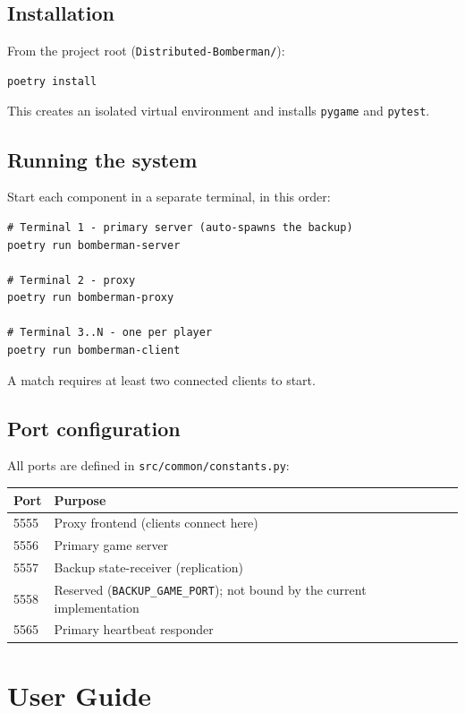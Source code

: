 \documentclass{scrartcl}
\begin{document}
\subsection{Installation}

From the project root (\texttt{Distributed-Bomberman/}):
\begin{lstlisting}
poetry install
\end{lstlisting}
This creates an isolated virtual environment and installs \texttt{pygame} and \texttt{pytest}.

\subsection{Running the system}

Start each component in a separate terminal, in this order:
\begin{lstlisting}
# Terminal 1 - primary server (auto-spawns the backup)
poetry run bomberman-server

# Terminal 2 - proxy
poetry run bomberman-proxy

# Terminal 3..N - one per player
poetry run bomberman-client
\end{lstlisting}

A match requires at least two connected clients to start.

\subsection{Port configuration}

All ports are defined in \texttt{src/common/constants.py}:

\begin{tabular}{ll}
\hline
Port & Purpose \\
\hline
5555 & Proxy frontend (clients connect here) \\
5556 & Primary game server \\
5557 & Backup state-receiver (replication) \\
5558 & Reserved (\texttt{BACKUP\_GAME\_PORT}); not bound by the current implementation \\
5565 & Primary heartbeat responder \\
\hline
\end{tabular}

\section{User Guide}\label{user-guide}
\end{document}
